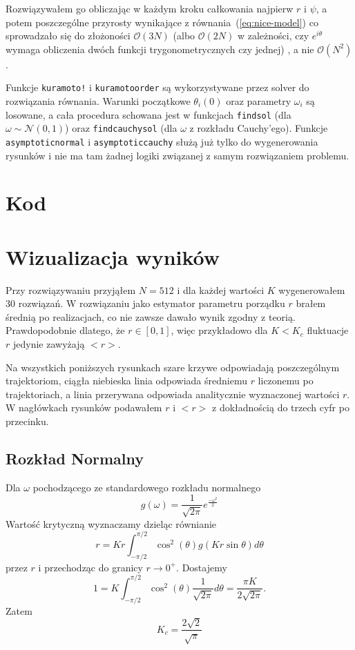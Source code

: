 \documentclass[12pt]{article}
\begin{document}
Rozwiązywałem go obliczając w każdym kroku całkowania najpierw $r$ i $\psi$, a potem poszczególne przyrosty wynikające z równania~(\ref{eq:nice-model}) co sprowadzało się do złożoności $\mathcal{O}(3N)$ (albo $\mathcal{O}(2N)$ w zależności, czy $e^{i\theta}$ wymaga obliczenia dwóch funkcji trygonometrycznych czy jednej) , a nie $\mathcal{O}(N^2)$.

Funkcje \texttt{kuramoto!} i \texttt{kuramotoorder} są wykorzystywane przez solver do rozwiązania równania.
Warunki początkowe $\theta_i(0)$ oraz parametry $\omega_i$ są losowane, a cała procedura schowana jest w funkcjach \texttt{findsol} (dla $\omega \sim \mathcal{N}(0,1)$) oraz \texttt{findcauchysol} (dla $\omega$ z rozkładu Cauchy'ego).
Funkcje \texttt{asymptoticnormal} i \texttt{asymptoticcauchy} służą już tylko do wygenerowania rysunków i nie ma tam żadnej logiki związanej z samym rozwiązaniem problemu.


\section{Kod}


\section{Wizualizacja wyników}
Przy rozwiązywaniu przyjąłem $N=512$ i dla każdej wartości $K$ wygenerowałem 30 rozwiązań. 
W rozwiązaniu jako estymator parametru porządku $r$ brałem średnią po realizacjach, co nie zawsze dawało wynik zgodny z teorią. 
Prawdopodobnie dlatego, że $r \in [0,1]$, więc przykładowo dla $K < K_c$ fluktuacje $r$ jedynie zawyżają $<r>$.

Na wszystkich poniższych rysunkach szare krzywe odpowiadają poszczególnym trajektoriom, ciągła niebieska linia odpowiada średniemu $r$ liczonemu po trajektoriach, a linia przerywana odpowiada analitycznie wyznaczonej wartości $r$.
W nagłówkach rysunków podawałem $r$ i $<r>$ z dokładnością do trzech cyfr po przecinku. 

\subsection{Rozkład Normalny}
Dla $\omega$ pochodzącego ze standardowego rozkładu normalnego
\begin{equation}
g(\omega) = \frac{1}{\sqrt{2\pi}} e^{\frac{-\omega^2}{2}}
\end{equation}
Wartość krytyczną wyznaczamy dzieląc równianie
\begin{equation}
r = K r \int_{-\pi/2}^{\pi/2} \cos^2{(\theta)} g(Kr \sin \theta) d \theta 
\end{equation}
przez $r$ i przechodząc do granicy $r \to 0^+$. Dostajemy
\begin{equation}
1 = K \int_{-\pi/2}^{\pi/2} \cos^2{(\theta)} \frac{1}{\sqrt{2\pi}} d \theta = \frac{\pi K}{2\sqrt{2\pi}}.
\end{equation}
Zatem
\begin{equation}
\label{eq:K-crit}
K_c = \frac{2\sqrt{2}}{\sqrt{\pi}}
\end{equation}
\end{document}
